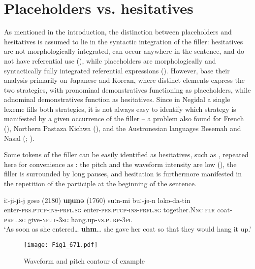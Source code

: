 \documentclass[output=paper]{langscibook}
\begin{document}
\section{Placeholders vs. hesitatives}
\label{sec:pakendorf:3}
As mentioned in the introduction, the distinction between placeholders and hesitatives is assumed to lie in the syntactic integration of the filler: hesitatives are not morphologically integrated, can occur anywhere in the sentence, and do not have referential use (\citealt[512]{HayashiYoon2006}), while placeholders are morphologically and syntactically fully integrated referential expressions (\citealt[490]{HayashiYoon2006}). However, \citet{HayashiYoon2006} base their analysis primarily on Japanese and Korean, where distinct elements express the two strategies, with pronominal demonstratives functioning as placeholders, while adnominal demonstratives function as hesitatives. Since in Negidal a single lexeme fills both strategies, it is not always easy to identify which strategy is manifested by a given occurrence of the filler – a problem also found for French (\citealt{HenneckeMihatsch2022}), Northern Pastaza Kichwa (), and the Austronesian languages Besemah and Nasal (; ). 

Some tokens of the filler can be easily identified as hesitatives, such as , repeated here for convenience as : the pitch and the waveform intensity are low (), the filler is surrounded by long pauses, and hesitation is furthermore manifested in the repetition of the participle at the beginning of the sentence. 


\ea \label{ex:pakendorf:4}
	iː-ji-ɟi-j
	gəsə
	\textup{(2180)}
	\textbf{uŋunə}
	\textup{(1760)}
	suːn-mi
	buː-jə-n
	loko-da-tin\\
    enter-\textsc{prs.ptcp-ins-prfl.sg}
    enter-\textsc{prs.ptcp-ins-prfl.sg}
    together.\textsc{Nnc}
    {}
    \textsc{flr}
    {}
    coat-\textsc{prfl.sg}
    give-\textsc{nfut-3sg}
    hang.up-\textsc{vs.purp-3pl}\\
\glt ‘As soon as she entered… \textbf{uhm}… she gave her coat so that they would hang it up.’ 
\z

\begin{figure}
\texttt{[image: Fig1\_671.pdf]}
\caption{Waveform and pitch contour of example }
\label{fig:pakendorf:1}
\end{figure}
\end{document}
